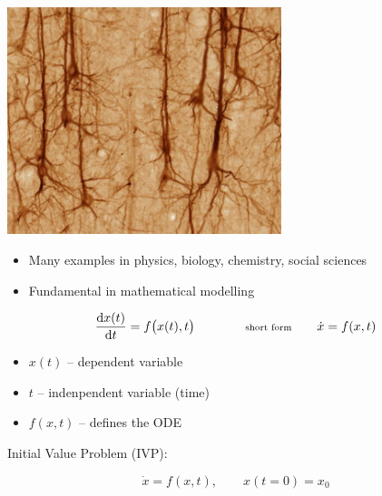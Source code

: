 \begin{frame}
\begin{minipage}{0.48\textwidth}
\begin{center}
  \includegraphics[draft=false,width=0.6\textwidth]{neuron.jpg}
 \end{center}
\end{minipage}
\pause
\vspace{2ex}

\begin{itemize}
 \item Many examples in physics, biology, chemistry, social sciences
 \item Fundamental in mathematical modelling
\end{itemize}

\end{frame}



\begin{frame}
 

 $$\frac{\mbox{d} x(t)}{\mbox{d} t} = f\big(x(t) , t\big) \qquad \qquad {\scriptsize \text{short form}} \qquad \dot{x} = f(x,t)
$$

 \begin{itemize}
  \item $x(t)$ -- dependent variable
  \item $t$ -- indenpendent variable (time)
  \item $f(x,t)$ -- defines the ODE
 \end{itemize}

\vspace{4ex}

 Initial Value Problem (IVP):

 $$\dot x = f( x , t ) ,\qquad x(t=0) = x_0$$

\end{frame}


